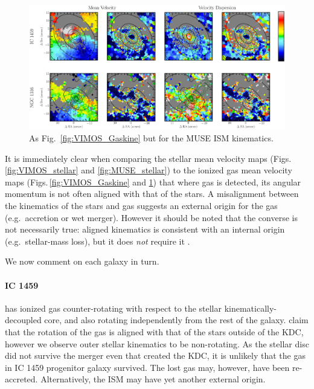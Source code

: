 	\begin{figure}
		\centering
		\includegraphics[height=0.31\textheight]{chapter5/muse/kin.png}
		\caption[MUSE ISM kinematic maps]{As Fig.\ \ref{fig:VIMOS_Gaskine} but for the MUSE ISM kinematics.}
		\label{fig:MUSE_Gaskine}
	\end{figure}


	It is immediately clear when comparing the stellar mean velocity maps (Figs.\,\ref{fig:VIMOS_stellar} and \ref{fig:MUSE_stellar}) to the ionized gas mean velocity maps (Figs.\,\ref{fig:VIMOS_Gaskine} and \ref{fig:MUSE_Gaskine}) that where gas is detected, its angular momentum is not often aligned with that of the stars. A misalignment between the kinematics of the stars and gas suggests an external origin for the gas (e.g.\ accretion or wet merger). However it should be noted that the converse is not necessarily true: aligned kinematics is consistent with an internal origin (e.g.\ stellar-mass loss), but it does \emph{not} require it \citep[e.g.][]{Davis2011a}. 

	We now comment on each galaxy in turn.

	\paragraph{IC 1459} has ionized gas counter-rotating with respect to the stellar kinematically-decoupled core, and also rotating independently from the rest of the galaxy. \citet{Franx1988} claim that the rotation of the gas is aligned with that of the stars outside of the KDC, however we observe outer stellar kinematics to be non-rotating. As the stellar disc did not survive the merger even that created the KDC, it is unlikely that the gas in IC 1459 progenitor galaxy survived. The lost gas may, however, have been re-accreted. Alternatively, the ISM may have yet another external origin. 

